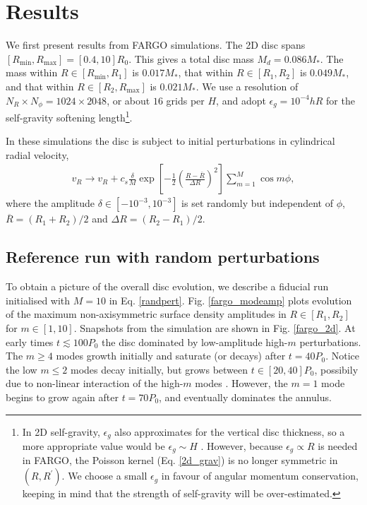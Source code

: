 \section{Results}\label{results2d}
We first present results from FARGO simulations. The 2D disc spans
$[R_\mathrm{min}, R_\mathrm{max}] = [0.4,10]R_0$. This gives a total
disc mass $M_{d}=0.086M_*$. The mass within
$R\in[R_\mathrm{min},R_{1}]$ is $0.017M_*$, that within
$R\in[R_{1},R_{2}]$ is $0.049M_*$, and that within
$R\in[R_{2},R_\mathrm{max}]$ is $0.021M_*$. We use a resolution of
$N_R\times N_\phi = 1024\times 2048$, or about $16$ grids per $H$, and
adopt $\epsilon_g=10^{-4}hR$ for the   
self-gravity softening length\footnote{In 2D self-gravity, $\epsilon_g$ also
  approximates for the vertical disc thickness, so a more appropriate
  value would be $\epsilon_g\sim H$ \citep{muller12}. However, because
  $\epsilon_g\propto R$ is needed in FARGO, the Poisson kernel
  (Eq. \ref{2d_grav}) is no longer symmetric in $(R,R^\prime)$. We
  choose a small  
  $\epsilon_g$ in favour of angular momentum conservation, keeping in
  mind that the strength of self-gravity will be over-estimated.}.

In these simulations the disc is subject to initial perturbations in 
cylindrical radial velocity, 
\begin{align}\label{randpert}
  v_R \to v_R+ c_s\frac{\delta}{M}
  \exp{\left[-\frac{1}{2}\left(\frac{R-\overline{R}}{\Delta 
          R}\right)^2\right]}\sum_{m=1}^M\cos{m\phi},
\end{align}
where the amplitude $\delta\in[-10^{-3},10^{-3}]$ is set randomly but
independent of $\phi$, $\overline{R} = (R_{1}+R_{2})/2$
and $\Delta R = (R_{2}-R_{1})/2$. 

\subsection{Reference run with random perturbations}
To obtain a picture of the overall disc evolution, we describe a 
fiducial run initialised with $M=10$ in Eq. \ref{randpert}. 
Fig. \ref{fargo_modeamp} plots evolution of the maximum 
non-axisymmetric surface density amplitudes in $R\in[R_{1},R_{2}]$
for $m\in[1,10]$. Snapshots from the simulation are shown in
Fig. \ref{fargo_2d}. 
At early times $t\lesssim100P_0$ the disc 
dominated by low-amplitude high-$m$ perturbations. The $m\geq4$ modes
growth initially and saturate (or decays) after $t=40P_0$. Notice the
low $m\leq 2$ modes decay initially, but grows between $t\in[20,40]P_0$,
possibily due to non-linear interaction of the high-$m$ modes  
\citep{laughlin96,laughlin97}. However, the $m=1$ mode begins to grow
again after $t=70P_0$, and eventually dominates the annulus. 

